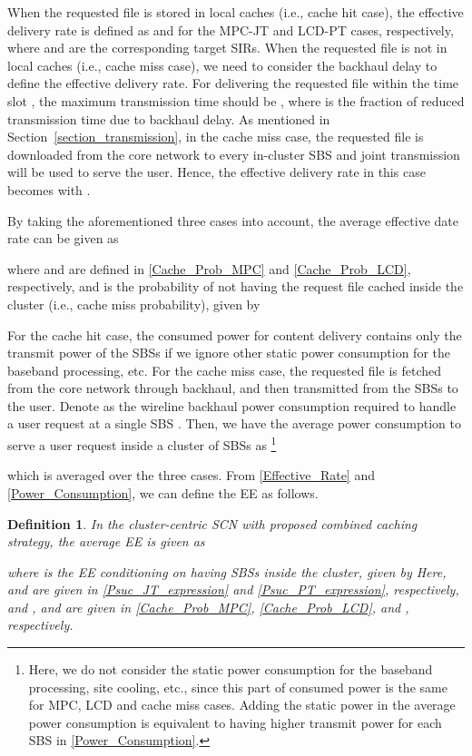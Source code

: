 \documentclass[twocolumns,10pt]{IEEEtran}
\newtheorem{definition}{Definition}
\begin{document}
When the requested file is stored in local caches (i.e., cache hit case), the effective delivery rate is defined as
 and 
for the MPC-JT and LCD-PT cases, respectively, where  and  are the corresponding target SIRs.
When the requested file is not in local caches (i.e., cache miss case), we need to consider the backhaul delay  to define the effective delivery rate. 
For delivering the requested file within the time slot ,
the maximum transmission time should be , 
where  is the fraction of reduced transmission time due to backhaul delay. As mentioned in Section~\ref{section_transmission}, in the cache miss case, the requested file is downloaded from the core network to every in-cluster SBS and joint transmission will be used to serve the user. 
Hence, the effective delivery rate in this case becomes  with .



By taking the aforementioned three cases into account, the average effective date rate can be given as

where  and  are defined in \eqref{Cache_Prob_MPC} and \eqref{Cache_Prob_LCD}, respectively,
and  is the probability of not having the request file cached inside the cluster (i.e., cache miss probability), given by




For the cache hit case, the consumed power for content delivery contains only the transmit power of the  SBSs if we ignore other static power consumption for the baseband processing, etc.
For the cache miss case, the requested file is fetched from the core network through backhaul, and then transmitted from the  SBSs to the user. Denote  as the wireline backhaul power consumption required to handle a user request at a single SBS \cite{backhaul}. Then, we have the average power consumption to serve a user request inside a cluster of  SBSs as \footnote{Here, we do not consider the static power consumption for the baseband processing, site cooling, etc., since this part of consumed power is the same for MPC, LCD and cache miss cases. Adding the static power in the average power consumption is equivalent to having higher transmit power  for each SBS in \eqref{Power_Consumption}.}

which is averaged over the three cases. From \eqref{Effective_Rate} and \eqref{Power_Consumption}, we can define the EE as follows.


\begin{definition}
	 In the cluster-centric SCN with proposed combined caching strategy, the average EE is given as
	
	where  is the EE conditioning on having  SBSs inside the cluster, given by
 Here,  and  are given in \eqref{Psuc_JT_expression} and \eqref{Psuc_PT_expression}, respectively, and 
,  and  are given in \eqref{Cache_Prob_MPC}, \eqref{Cache_Prob_LCD}, and , respectively.
\end{definition}
\end{document}

